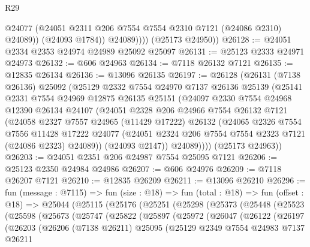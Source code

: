 \begin{lexlean}{R29}
\begin{coremodule}
                  @24077
                  (@24051 @2311 @206 @7554 @7554 @2310 @7121 (@24086 @2310) @24089))
                (@24093 @1784))
              @24089))))
      (@25173 @24950))
@26128 := @24051 @2334 @2353 @24974 @24989 @25092 @25097
@26131 := @25123 @2333 @24971 @24973
@26132 := @606 @24963
@26134 := @7118 @26132 @7121
@26135 := @12835 @26134
@26136 := @13096 @26135
@26197 := @26128
    (@26131
      (@7138 @26136)
      @25092
      (@25129
        @2332
        @7554
        @24970
        @7137
        @26136
        @25139
        (@25141
          @2331
          @7554
          @24969
          @12875
          @26135
          @25151
          (@24097
            @2330
            @7554
            @24968
            @12390
            @26134
            @24107
            (@24051
              @2328
              @206
              @24966
              @7554
              @26132
              @7121
              (@24058
                @2327
                @7557
                @24965
                (@11429 @17222)
                @26132
                (@24065
                  @2326
                  @7554
                  @7556
                  @11428
                  @17222
                  @24077
                  (@24051 @2324 @206 @7554 @7554 @2323 @7121 (@24086 @2323) @24089))
                (@24093 @2147))
              @24089))))
      (@25173 @24963))
@26203 := @24051 @2351 @206 @24987 @7554 @25095 @7121
@26206 := @25123 @2350 @24984 @24986
@26207 := @606 @24976
@26209 := @7118 @26207 @7121
@26210 := @12835 @26209
@26211 := @13096 @26210
@26296 := fun (message : @7115) =>
  fun (size : @18) =>
  fun (total : @18) =>
  fun (offset : @18) =>
  @25044
    (@25115
      (@25176
        (@25251
          (@25298
            (@25373
              (@25448
                (@25523
                  (@25598
                    (@25673
                      (@25747
                        (@25822
                          (@25897
                            (@25972
                              (@26047
                                (@26122
                                  (@26197
                                    (@26203
                                      (@26206
                                        (@7138 @26211)
                                        @25095
                                        (@25129
                                          @2349
                                          @7554
                                          @24983
                                          @7137
                                          @26211

\end{coremodule}
\end{lexlean}
